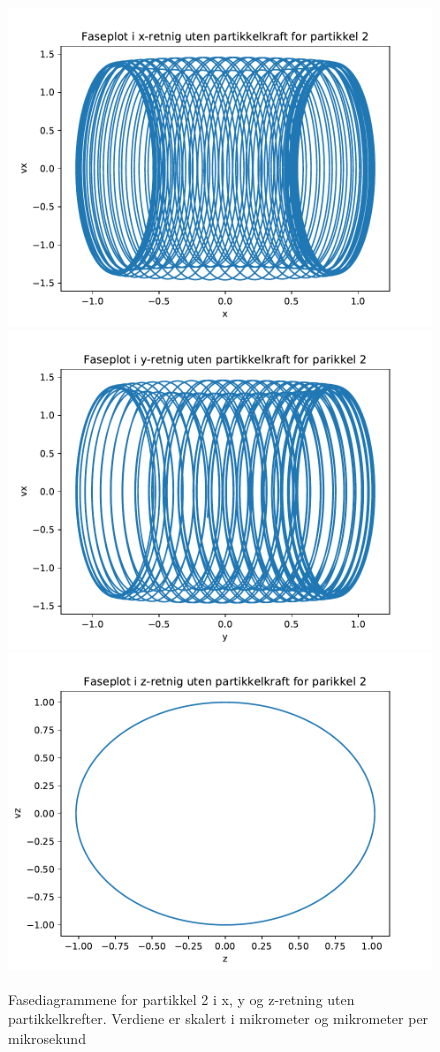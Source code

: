 \documentclass[reprint,english,notitlepage]{revtex4-1}  %
\begin{document}
\begin{figure}[H]
	\label{fasenoint2}
	\centering 
	\includegraphics[scale=0.4]{../pythonplots/xnoint2.pdf}
	\includegraphics[scale=0.4]{../pythonplots/ynoint2.pdf}
	\includegraphics[scale=0.4]{../pythonplots/znoint2.pdf}
	\caption{Fasediagrammene for partikkel 2 i x, y og z-retning uten partikkelkrefter. Verdiene er skalert i mikrometer og mikrometer per mikrosekund}
\end{figure}
\end{document}

